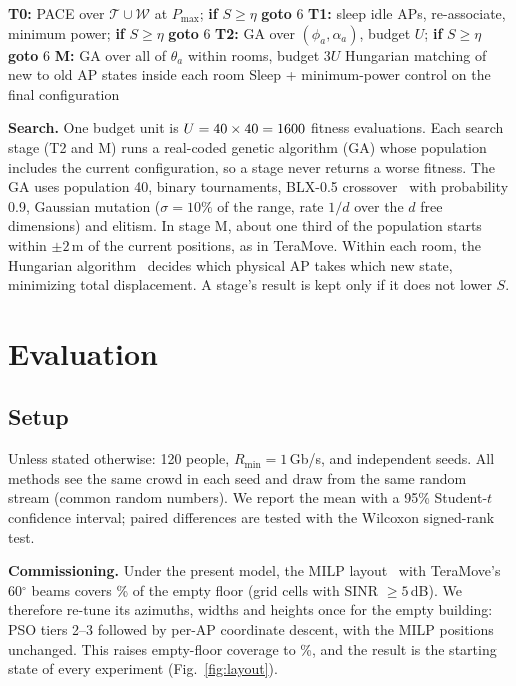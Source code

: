 \documentclass[conference]{IEEEtran}
\newcommand{\Rmin}{R_{\min}}
\newcommand{\Pmax}{P_{\max}}
\begin{document}
\begin{algorithm}[t]
\caption{TeraMove-H adaptation for one crowd snapshot}\label{alg:cascade}
\begin{algorithmic}[1]
\State \textbf{T0:} PACE over $\mathcal{T}\cup\mathcal{W}$ at $\Pmax$; \textbf{if} $S\ge\eta$ \textbf{goto} 6
\State \textbf{T1:} sleep idle APs, re-associate, minimum power; \textbf{if} $S\ge\eta$ \textbf{goto} 6
\State \textbf{T2:} GA over $(\phi_a,\alpha_a)$, budget $U$; \textbf{if} $S\ge\eta$ \textbf{goto} 6
\State \textbf{M:} GA over all of $\theta_a$ within rooms, budget $3U$
\State Hungarian matching of new to old AP states inside each room
\State Sleep + minimum-power control on the final configuration
\end{algorithmic}
\end{algorithm}

\textbf{Search.}
One budget unit is $U=40\times40=1600$ fitness evaluations.
Each search stage (T2 and M) runs a real-coded genetic algorithm (GA) whose population includes the current configuration, so a stage never returns a worse fitness.
The GA uses population 40, binary tournaments, BLX-0.5 crossover~\cite{eshelman1993blx} with probability 0.9, Gaussian mutation ($\sigma=10\%$ of the range, rate $1/d$ over the $d$ free dimensions) and elitism.
In stage M, about one third of the population starts within $\pm2$\,m of the current positions, as in TeraMove.
Within each room, the Hungarian algorithm~\cite{kuhn1955hungarian} decides which physical AP takes which new state, minimizing total displacement.
A stage's result is kept only if it does not lower $S$.

\section{Evaluation}\label{sec:eval}
\subsection{Setup}
Unless stated otherwise: 120 people, $\Rmin=1$\,Gb/s, and \MainSeeds{} independent seeds.
All methods see the same crowd in each seed and draw from the same random stream (common random numbers).
We report the mean with a 95\% Student-$t$ confidence interval; paired differences are tested with the Wilcoxon signed-rank test.

\textbf{Commissioning.}
Under the present model, the MILP layout~\cite{anon2026milp} with TeraMove's 60$^\circ$ beams covers \MilpCovCorrected\% of the empty floor (grid cells with SINR $\ge5$\,dB).
We therefore re-tune its azimuths, widths and heights once for the empty building: PSO tiers 2--3 followed by per-AP coordinate descent, with the MILP positions unchanged.
This raises empty-floor coverage to \CommissionedCov\%, and the result is the starting state of every experiment (Fig.~\ref{fig:layout}).
\end{document}
